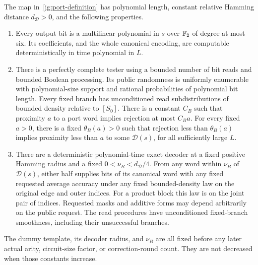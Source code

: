 \begin{proposition}\label{prop:dummy-port}
The map in~\eqref{ig:port-definition} has polynomial length, constant
relative Hamming distance $d_{\mathcal D}>0$, and the following properties.
\begin{enumerate}[label=\textup{(\roman*)}]
\item Every output bit is a multilinear polynomial in $s$ over $\mathbb{F}_2$ of
 degree at most six. Its coefficients, and the whole canonical encoding,
 are computable deterministically in time polynomial in $L$.
\item There is a perfectly complete tester using a bounded number of bit
 reads and bounded Boolean processing. Its public randomness is uniformly
 enumerable with polynomial-size support and rational probabilities of
 polynomial bit length. Every fixed branch has unconditioned read
 subdistributions of bounded density relative to $[S_0]$. There is a
 constant $C_B$ such that proximity $a$ to a port word implies rejection
 at most $C_Ba$. For every fixed $a>0$, there is a fixed
 $\theta_B(a)>0$ such that rejection less than $\theta_B(a)$ implies
 proximity less than $a$ to some $\mathcal D(s)$, for all sufficiently
 large $L$.
\item There are a deterministic polynomial-time exact decoder at a fixed
 positive Hamming radius and a fixed
 $0<\nu_B<d_{\mathcal D}/4$. From any word within $\nu_B$ of
 $\mathcal D(s)$, either half supplies bits of its canonical word with
 any fixed requested average accuracy under any fixed bounded-density
 law on the original edge and outer indices. For a product block this
 law is on the joint pair of indices. Requested masks and additive
 forms may depend arbitrarily on the public request. The read procedures
 have unconditioned fixed-branch smoothness, including their unsuccessful
 branches.
\end{enumerate}
The dummy template, its decoder radius, and $\nu_B$ are all fixed before
any later actual arity, circuit-size factor, or correction-round count.
They are not decreased when those constants increase.
\end{proposition}

